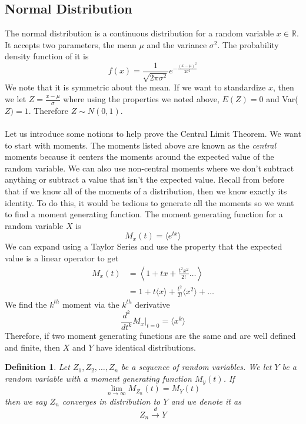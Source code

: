 \documentclass{article}
\newtheorem{definition}{Definition}[section]
\begin{document}
\subsection{Normal Distribution}
The normal distribution is a continuous distribution for a random variable $x\in \mathbb{R}$. It accepts two parameters, the mean $\mu$ and the variance $\sigma^2$. The probability density function of it is 
\begin{equation*}
    f(x) = \frac{1}{\sqrt{2\pi \sigma^2}} e^{-\frac{(x-\mu)^2}{2\sigma^2}}
\end{equation*}
We note that it is symmetric about the mean. If we want to standardize $x$, then we let $Z= \frac{x-\mu}{\sigma}$ where using the properties we noted above,  $E(Z) = 0$ and Var($Z)=1$. Therefore $Z \sim N(0,1)$. \\\\Let us introduce some notions to help prove the Central Limit Theorem. We want to start with moments. The moments listed above are known as the \emph{central} moments because it centers the moments around the expected value of the random variable. We can also use non-central moments where we don't subtract anything or subtract a value that isn't the expected value. Recall from before that if we know all of the moments of a distribution, then we know exactly its identity. To do this, it would be tedious to generate all the moments so we want to find a moment generating function. The moment generating function for a random variable $X$ is 
\begin{equation*}
    M_x(t) = \langle e^{tx}\rangle
\end{equation*}
We can expand using a Taylor Series and use the property that the expected value is a linear operator to get
\begin{equation*}
    \begin{split}
        M_x(t)& =\left \langle 1+tx+\frac{t^2x^2}{2!} \ldots \right\rangle \\
        &= 1 + t\langle x\rangle + \frac{t^2}{2!} \langle x^2 \rangle + \ldots
    \end{split}
\end{equation*}
We find the $k^{th}$ moment via the $k^{th}$ derivative
\begin{equation*}
    \frac{d^k}{dt^k}M_x \Bigg|_{t=0} = \langle x^k\rangle
\end{equation*}
Therefore, if two moment generating functions are the same and are well defined and finite, then $X$ and $Y$ have identical distributions. 
\begin{definition}
    Let $Z_1,Z_2,\ldots,Z_n$ be a sequence of random variables. We let $Y$ be a random variable with a moment generating function $M_y(t)$. If 
    \begin{equation*}
        \lim_{n\rightarrow \infty} M_{Z_n} (t) = M_Y(t)
    \end{equation*}
    then we say $Z_n$ \emph{converges in distribution} to $Y$ and we denote it as 
    \begin{equation*}
        Z_n \overset{d}{\longrightarrow}Y
    \end{equation*}
\end{definition}
\end{document}
